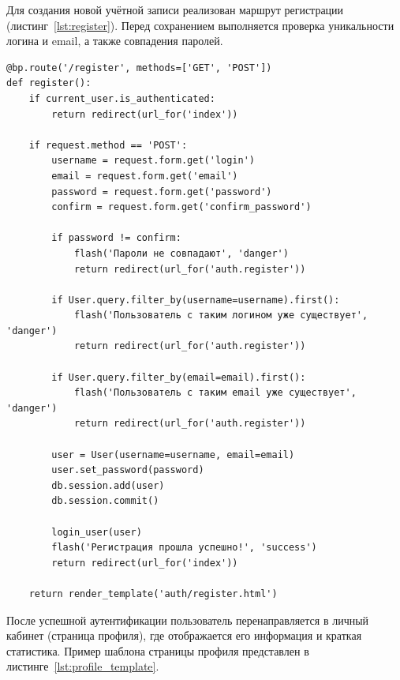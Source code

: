 \documentclass[14pt, a4paper]{extarticle}
\begin{document}
Для создания новой учётной записи реализован маршрут регистрации (листинг~\ref{lst:register}). Перед сохранением выполняется проверка уникальности логина и email, а также совпадения паролей.

\begin{lstlisting}[caption={Обработчик регистрации пользователя}, label={lst:register}]
@bp.route('/register', methods=['GET', 'POST'])
def register():
    if current_user.is_authenticated:
        return redirect(url_for('index'))

    if request.method == 'POST':
        username = request.form.get('login')
        email = request.form.get('email')
        password = request.form.get('password')
        confirm = request.form.get('confirm_password')

        if password != confirm:
            flash('Пароли не совпадают', 'danger')
            return redirect(url_for('auth.register'))

        if User.query.filter_by(username=username).first():
            flash('Пользователь с таким логином уже существует', 'danger')
            return redirect(url_for('auth.register'))

        if User.query.filter_by(email=email).first():
            flash('Пользователь с таким email уже существует', 'danger')
            return redirect(url_for('auth.register'))

        user = User(username=username, email=email)
        user.set_password(password)
        db.session.add(user)
        db.session.commit()

        login_user(user)
        flash('Регистрация прошла успешно!', 'success')
        return redirect(url_for('index'))

    return render_template('auth/register.html')
\end{lstlisting}

После успешной аутентификации пользователь перенаправляется в личный кабинет (страница профиля), где отображается его информация и краткая статистика. Пример шаблона страницы профиля представлен в листинге~\ref{lst:profile_template}.
\end{document}
